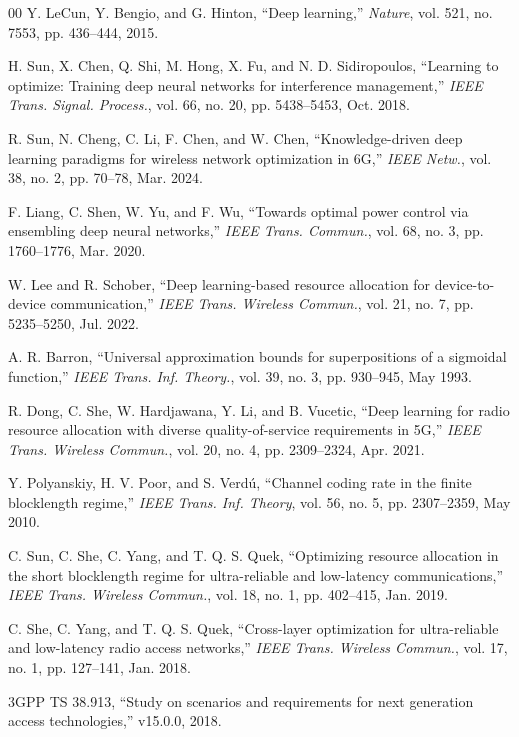 \begin{thebibliography}{00}
Y. LeCun, Y. Bengio, and G. Hinton, ``Deep learning,'' \textit{Nature}, vol. 521, no. 7553, pp. 436--444, 2015.

H. Sun, X. Chen, Q. Shi, M. Hong, X. Fu, and N. D. Sidiropoulos, ``Learning to optimize: Training deep neural networks for interference management,'' \textit{IEEE Trans. Signal. Process.}, vol. 66, no. 20, pp. 5438--5453, Oct. 2018.

R. Sun, N. Cheng, C. Li, F. Chen, and W. Chen, ``Knowledge-driven deep learning paradigms for wireless network optimization in 6G,'' \textit{IEEE Netw.}, vol. 38, no. 2, pp. 70--78, Mar. 2024.

F. Liang, C. Shen, W. Yu, and F. Wu, ``Towards optimal power control via ensembling deep neural networks,'' \textit{IEEE Trans. Commun.}, vol. 68, no. 3, pp. 1760--1776, Mar. 2020.

W. Lee and R. Schober, ``Deep learning-based resource allocation for device-to-device communication,'' \textit{IEEE Trans. Wireless Commun.}, vol. 21, no. 7, pp. 5235--5250, Jul. 2022.

A. R. Barron, ``Universal approximation bounds for superpositions of a sigmoidal function,'' \textit{IEEE Trans. Inf. Theory.}, vol. 39, no. 3, pp. 930--945, May 1993.

R. Dong, C. She, W. Hardjawana, Y. Li, and B. Vucetic, ``Deep learning for radio resource allocation with diverse quality-of-service requirements in 5G,'' \textit{IEEE Trans. Wireless Commun.}, vol. 20, no. 4, pp. 2309--2324, Apr. 2021.

Y. Polyanskiy, H. V. Poor, and S. Verd\'{u}, ``Channel coding rate in the finite blocklength regime,'' \emph{IEEE Trans. Inf. Theory}, vol. 56, no. 5, pp. 2307--2359, May 2010.

C. Sun, C. She, C. Yang, and T. Q. S. Quek, ``Optimizing resource allocation in the short blocklength regime for ultra-reliable and low-latency communications,'' \emph{IEEE Trans. Wireless Commun.}, vol. 18, no. 1, pp. 402--415, Jan. 2019.

C. She, C. Yang, and T. Q. S. Quek, ``Cross-layer optimization for ultra-reliable and low-latency radio access networks,'' \emph{IEEE Trans. Wireless Commun.}, vol. 17, no. 1, pp. 127--141, Jan. 2018.

3GPP TS 38.913, ``Study on scenarios and requirements for next generation access technologies,'' v15.0.0, 2018.


\end{thebibliography}
